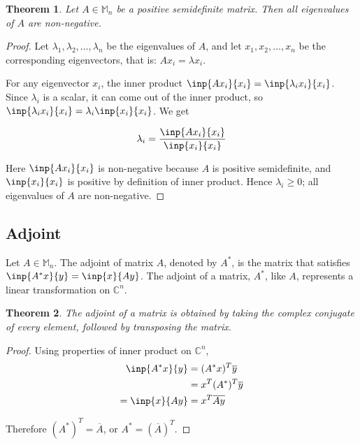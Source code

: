 \documentclass[twoside]{article}
\newcommand*\conj[1]{\overline{#1}}
\newcommand*\adj[1]{#1^*}
\newcommand*\trp[1]{#1^T}
\theoremstyle{plain}
\newtheorem{theorem}{Theorem}
\theoremstyle{definition}
\theoremstyle{remark}
\begin{document}
\begin{theorem} Let \(A \in \mathbb{M}_n\) be a positive semidefinite matrix. Then all eigenvalues of \(A\) are non-negative. \end{theorem}
\begin{proof} Let \(\lambda_1, \lambda_2, \ldots , \lambda_n\) be the eigenvalues of \(A\), and let \(x_1, x_2, \ldots , x_n\) be the corresponding eigenvectors, that is: \(Ax_i = \lambda x_i\). 

 For any eigenvector \(x_i\), the inner product \(\inp{Ax_i}{x_i} = \inp{\lambda_i x_i}{x_i}\). Since \(\lambda_i\) is a scalar, it can come out of the inner product, so  \( \inp{\lambda_i x_i}{x_i}  = \lambda_i \inp{x_i}{x_i}\). We get

\[\lambda_i = \frac{\inp{Ax_i}{x_i}}{\inp{x_i}{x_i}}\]

Here \(\inp{Ax_i}{x_i} \) is non-negative because \(A\) is positive semidefinite, and \(\inp{x_i}{x_i}\) is positive by definition of inner product. Hence \(\lambda_i \ge 0\); all eigenvalues of \(A\) are non-negative. \end{proof}


\subsection{Adjoint}

Let \(A \in \mathbb{M}_n\). The adjoint of matrix \(A\), denoted by \(\adj{A}\), is the matrix that  satisfies \(\inp{\adj{A}x}{y} = \inp{x}{Ay}\). The adjoint of a matrix, \(\adj{A}\), like \(A\), represents a linear transformation on \(\mathbb{C}^n\).

\begin{theorem} The adjoint of a matrix is obtained by taking the complex conjugate of every element, followed by transposing the matrix. \end{theorem}

\begin{proof} Using properties of inner product on \(\mathbb{C}^n\),
\begin{equation*} \begin{split}
\inp{\adj{A}x}{y} & = \trp{(\adj{A}x)} \conj{y}  \\
& = \trp{x} \trp{(\adj{A})} \conj{y}\\
= \inp{x}{Ay} & = \trp{x} \conj{Ay} 
\end{split} \end{equation*}

Therefore \(\trp{(\adj{A})} = \conj{A}\), or \(\adj{A} = \trp{(\conj{A})}\). \end{proof}
\end{document}

